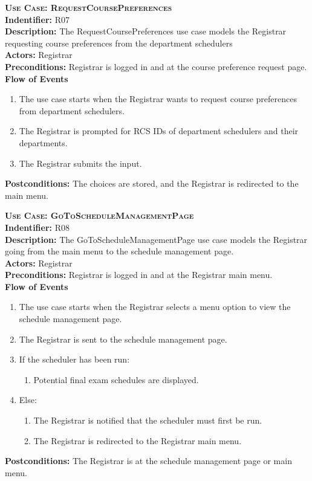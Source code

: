 \documentclass[11pt]{article}
\newenvironment{usecase}{%
	\def\title##1{ {\large \bfseries  \scshape {Use Case:} ##1} \\ }
 	\def\id##1{{\bf Indentifier:} ##1\\}
	\def\des##1{ {\bf Description:} ##1\\}
	\def\actors##1{ {\bf Actors:} ##1\\}
    	\def\pre##1{ {\bf Preconditions:} ##1 \\} %
    	\def\flow##1{ {\bf Flow of Events} ##1}%
    	\newenvironment{ucenum}{%
        	\begin{enumerate}[nolistsep]\small}%
        	{\end{enumerate}}
	\def\post##1{ {\bf Postconditions:} ##1 \\}
}{\vspace{.05in}}
\begin{document}
\begin{usecase}
  \title{RequestCoursePreferences}
  \id{R07}
  \des{The RequestCoursePreferences use case models the Registrar requesting course preferences from the department schedulers}
  \actors{Registrar}
  \pre{Registrar is logged in and at the course preference request page.}
  \flow{}
  \begin{ucenum}
  \item The use case starts when the Registrar wants to request course preferences from department schedulers.
  \item The Registrar is prompted for RCS IDs of department schedulers and their departments.
  \item The Registrar submits the input.
  \end{ucenum}
  \post{The choices are stored, and the Registrar is redirected to the main menu.}
\end{usecase}

\begin{usecase}
  \title{GoToScheduleManagementPage}
  \id{R08}
  \des{The GoToScheduleManagementPage use case models the Registrar going from the main menu to the schedule management page.}
  \actors{Registrar}
  \pre{Registrar is logged in and at the Registrar main menu.}
  \flow{}
  \begin{ucenum}
  \item The use case starts when the Registrar selects a menu option to view the schedule management page.
  \item The Registrar is sent to the schedule management page.
  \item If the scheduler has been run:
    \begin{ucenum} \item Potential final exam schedules are displayed. \end{ucenum}
  \item Else:
    \begin{ucenum}
    \item The Registrar is notified that the scheduler must first be run.
    \item The Registrar is redirected to the Registrar main menu.
    \end{ucenum}
  \end{ucenum}
  \post{The Registrar is at the schedule management page or main menu.}
\end{usecase}
\end{document}
